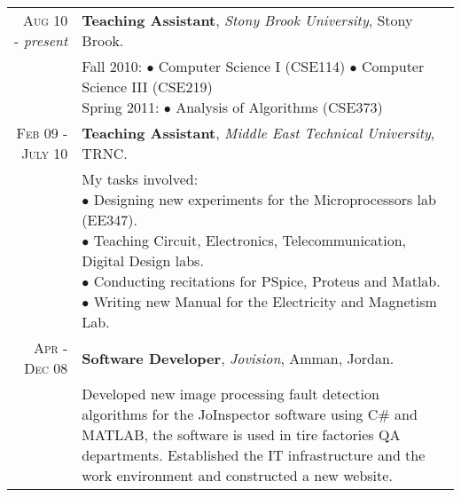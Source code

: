 \documentclass[a4paper, oneside, final]{scrartcl}
\newcommand{\twidthb}{12.65cm}
\begin{document}
\begin{tabular}{rm{\twidthb}}
\textsc{Aug 10} - \emph{present}  & \textbf{Teaching Assistant}, \emph{Stony Brook University}, Stony Brook. \\
                    & \footnotesize{\parbox{\twidthb}{
                        Fall 2010:
                        $\bullet$ Computer Science I (CSE114)
                        $\bullet$ Computer Science III (CSE219)\\
                        Spring 2011: $\bullet$ Analysis of Algorithms (CSE373)}}

\\\textsc{Feb 09 - July 10}  & \textbf{Teaching Assistant}, \emph{Middle East Technical University}, TRNC. \\
                    & \footnotesize{\parbox{\twidthb}{
                        My tasks involved: \\
                        $\bullet$ Designing new experiments for the Microprocessors lab (EE347).\\
                        $\bullet$ Teaching Circuit, Electronics, Telecommunication, Digital Design labs.\\
                        $\bullet$ Conducting recitations for PSpice, Proteus and Matlab.\\
                        $\bullet$ Writing new Manual for the Electricity and Magnetism Lab.}}   

   \\ \textsc{Apr - Dec 08}  & \textbf{Software Developer}, \emph{Jovision}, Amman, Jordan. \\
                         & \footnotesize{Developed new image processing fault detection algorithms for the JoInspector software using C\# and MATLAB, the software is used in tire factories QA departments. Established the IT infrastructure and the work environment and constructed a new website.}

\\ 

\end{tabular}
\end{document}
